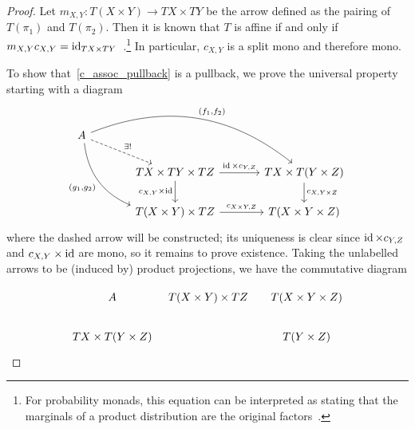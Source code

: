\documentclass[a4paper,UKenglish,numberwithinsect,cleveref, autoref, thm-restate]{lipics-v2021}
\theoremstyle{plain} %
\theoremstyle{definition} %
\begin{document}
\begin{proof}
	Let $m_{X,Y} : T(X \times Y) \longrightarrow TX \times TY$
	be the arrow defined as the pairing of $T(\pi_1)$ and $T(\pi_2)$.
	Then it is known that $T$ is affine if and only if $m_{X,Y} c_{X,Y} = \operatorname{ id}_{TX \times TY}$~\cite[Lemma~4.2(i)]{Jacobs1994}.\footnote{For probability monads, this equation can be interpreted as stating that the marginals of a product distribution are the original factors~\cite{Fritz2018}.}
	In particular, $c_{X,Y}$ is a split mono and therefore mono.

	To show that~\eqref{c_assoc_pullback} is a pullback, we prove the universal property starting with a diagram
	\begin{equation}
		\label{candidate_pullback}
		\begin{tikzcd}[column sep=3pc]
			A \ar[bend left]{drr}{(f_1, f_2)} \ar[bend right,swap]{ddr}{(g_1, g_2)} \ar[dashed]{dr}{\exists!}							\\
				& TX \times TY \times TZ \ar{r}{\id \times c_{Y,Z}} \ar[swap]{d}{c_{X,Y} \times \id}	& TX \times T(Y \times Z) \ar{d}{c_{X,Y \times Z}}	\\
				& T(X \times Y) \times TZ \ar{r}{c_{X\times Y,Z}}						& T(X \times Y \times Z)
		\end{tikzcd}
	\end{equation}
	where the dashed arrow will be constructed; its uniqueness is clear since $\operatorname{ id} \times c_{Y,Z}$ and $c_{X,Y} \times \operatorname{ id}$ are mono, so it remains to prove existence.
	Taking the unlabelled arrows to be (induced by) product projections, we have the commutative diagram
	\iffalse
	\[
		\begin{tikzcd}[column sep=small]
			A \ar{r}{(g_1, g_2)} \ar[swap]{d}{(f_1, f_2)}					& T(X \times Y) \times TZ \ar{r}{c_{X \times Y, Z}} 	& T(X \times Y \times Z) \ar{d}	\\
			TX \times T(Y \times Z) \ar{rr}	\ar["c_{X,Y \times Z}" description]{urr} 	&							& T(Y \times Z)
		\end{tikzcd}
	\]
	\fi
\[\begin{tikzcd}[column sep=tiny]
	A & {T(X\times Y)\times TZ} && {T(X\times Y\times Z)} \\
	{TX\times T(Y\times Z)} &&& {T(Y\times Z)}

\end{tikzcd}\]
\end{proof}
\end{document}
